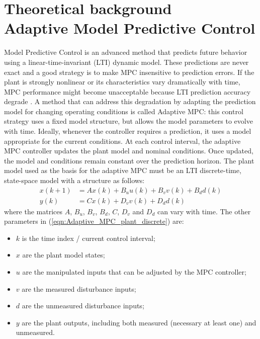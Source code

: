 \documentclass[conference, 11pt]{IEEEtran}
\begin{document}
\section{Theoretical background\\ Adaptive Model Predictive Control}
Model Predictive Control is an advanced method that predicts future behavior using a linear-time-invariant (LTI) dynamic model. These predictions are never exact and a good strategy is to make MPC insensitive to prediction errors. If the plant is strongly nonlinear or its characteristics vary dramatically with time, MPC performance might become unacceptable because LTI prediction accuracy degrade \cite{mpctoolbox}. A method that can address this degradation by adapting the prediction model for changing operating conditions is called Adaptive MPC: this control strategy uses a fixed model structure, but allows the model parameters to evolve with time. Ideally, whenever the controller requires a prediction, it uses a model appropriate for the current conditions. At each control interval, the adaptive MPC controller updates the plant model and nominal conditions. Once updated, the model and conditions remain constant over the prediction horizon. The plant model used as the basis for the adaptive MPC must be an LTI discrete-time, state-space model with a structure as follows:
\begin{equation}
\label{eqn:Adaptive_MPC_plant_discrete}
\begin{aligned}
x(k+1)&=Ax(k)+ B_u u(k)+B_v v(k)+B_d d(k)\\
y(k)&=Cx(k) + D_v v(k)+ D_d d(k)
\end{aligned}
\end{equation}
where the matrices $A$, $B_u$, $B_v$, $B_d$, $C$, $D_v$ and $D_d$ can vary with time. The other parameters in (\ref{eqn:Adaptive_MPC_plant_discrete}) are:
\begin{itemize}
	\item $k$ is the time index / current control interval;
	\item $x$ are the plant model states;
	\item $u$ are the manipulated inputs that can be adjusted by the MPC controller;
	\item $v$ are the measured disturbance inputs;
	\item $d$ are the unmeasured disturbance inputs;
	\item $y$ are the plant outputs, including both measured (necessary at least one) and unmeasured.
\end{itemize}
\end{document}

